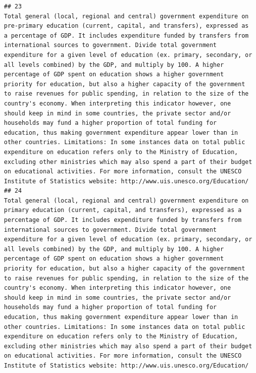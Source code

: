 \documentclass[
]{article}
\begin{document}
\begin{verbatim}
## 23                                                                                                                                                                                         Total general (local, regional and central) government expenditure on pre-primary education (current, capital, and transfers), expressed as a percentage of GDP. It includes expenditure funded by transfers from international sources to government. Divide total government expenditure for a given level of education (ex. primary, secondary, or all levels combined) by the GDP, and multiply by 100. A higher percentage of GDP spent on education shows a higher government priority for education, but also a higher capacity of the government to raise revenues for public spending, in relation to the size of the country's economy. When interpreting this indicator however, one should keep in mind in some countries, the private sector and/or households may fund a higher proportion of total funding for education, thus making government expenditure appear lower than in other countries. Limitations: In some instances data on total public expenditure on education refers only to the Ministry of Education, excluding other ministries which may also spend a part of their budget on educational activities. For more information, consult the UNESCO Institute of Statistics website: http://www.uis.unesco.org/Education/
## 24                                                                                                                                                                                             Total general (local, regional and central) government expenditure on primary education (current, capital, and transfers), expressed as a percentage of GDP. It includes expenditure funded by transfers from international sources to government. Divide total government expenditure for a given level of education (ex. primary, secondary, or all levels combined) by the GDP, and multiply by 100. A higher percentage of GDP spent on education shows a higher government priority for education, but also a higher capacity of the government to raise revenues for public spending, in relation to the size of the country's economy. When interpreting this indicator however, one should keep in mind in some countries, the private sector and/or households may fund a higher proportion of total funding for education, thus making government expenditure appear lower than in other countries. Limitations: In some instances data on total public expenditure on education refers only to the Ministry of Education, excluding other ministries which may also spend a part of their budget on educational activities. For more information, consult the UNESCO Institute of Statistics website: http://www.uis.unesco.org/Education/

\end{verbatim}
\end{document}

